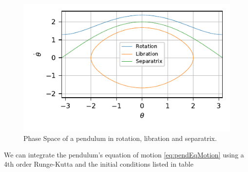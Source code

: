 \begin{figure}
    \centering
    \includegraphics{CodeAndFigures/PendulumPhaseSpace.pdf}
    \caption{Phase Space of a pendulum in rotation, libration and separatrix.}
    \label{fig:pendPhaseSpace}
\end{figure}
We can integrate the pendulum's equation of motion \ref{eq:pendEqMotion} using a 4th order Runge-Kutta and the initial conditions listed in table



